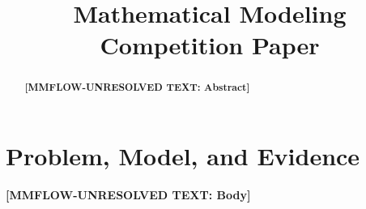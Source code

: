 \documentclass[12pt,letterpaper]{article}
\title{Mathematical Modeling Competition Paper}
\author{}
\date{}
\newcommand{\MMRequiredText}[1]{\textbf{[MMFLOW-UNRESOLVED TEXT: #1]}}
\begin{document}
\maketitle
\begin{abstract}
\MMRequiredText{Abstract}
\end{abstract}
\section{Problem, Model, and Evidence}
\MMRequiredText{Body}
\end{document}
